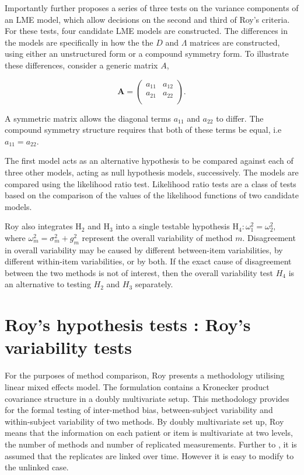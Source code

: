 \documentclass[12pt, a4paper]{report}
\theoremstyle{plain}
\theoremstyle{definition}
\theoremstyle{remark}
\begin{document}
Importantly \citet{ARoy2009} further proposes a series of three tests on the variance components of an LME model, which allow decisions on the second and third of Roy's criteria. For these tests, four candidate LME models are constructed. The differences in the models are specifically in how the the $D$ and $\Lambda$ matrices are constructed, using either an unstructured form or a compound symmetry form. To illustrate these differences, consider a generic matrix $A$,

\[
\boldsymbol{A} = \left( \begin{array}{cc}
a_{11} & a_{12}  \\
a_{21} & a_{22}  \\
\end{array}\right).
\]

A symmetric matrix allows the diagonal terms $a_{11}$ and $a_{22}$ to differ. The compound symmetry structure requires that both of these terms be equal, i.e $a_{11} = a_{22}$.

The first model acts as an alternative hypothesis to be compared against each of three other models, acting as null hypothesis models, successively. The models are compared using the likelihood ratio test. Likelihood ratio tests are a class of tests based on the comparison of the values of the likelihood functions of two candidate models. 


Roy also integrates $\mathrm{H}_2$ and $\mathrm{H}_3$ into a single testable hypothesis $\mathrm{H}_4\colon \omega^2_1=\omega^2_2,$ where $\omega^2_m = \sigma^2_m + g^2_m$ represent the overall variability of method $m.$  Disagreement in overall variability may be caused by different between-item variabilities, by different within-item variabilities, or by both.  If the exact cause of disagreement between the two methods is not of interest, then the overall variability test $H_4$ is an alternative to testing $H_2$ and $H_3$ separately.



\section{Roy's hypothesis tests : Roy's variability tests}

For the purposes of method comparison, Roy presents a methodology utilising linear mixed effects model. The formulation contains a Kronecker product covariance structure in a doubly multivariate setup. This methodology provides for the formal testing of inter-method bias, between-subject variability and within-subject variability of two methods. By doubly multivariate set up, Roy means that the information on each patient or item is multivariate at two levels, the number of methods and number of replicated measurements. Further to \citet{Lam}, it is assumed that the replicates are linked over time. However it is easy to modify to the unlinked case.
\end{document}
